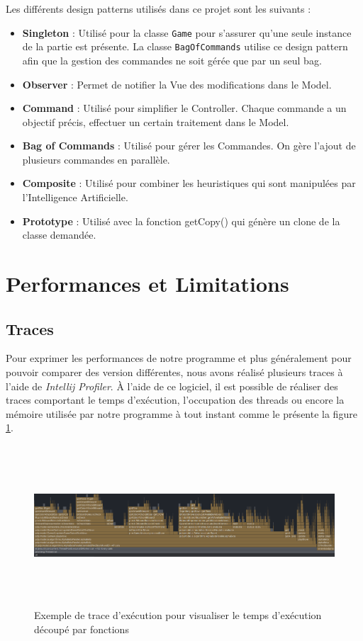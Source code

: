 \documentclass{article}
\begin{document}
Les différents design patterns utilisés dans ce projet sont les suivants :
\begin{itemize}
    \item \textbf{Singleton} : Utilisé pour la classe \texttt{Game} pour s'assurer qu'une seule instance de la partie est présente.
    La classe \texttt{BagOfCommands} utilise ce design pattern afin que la gestion des commandes ne soit gérée que par un seul bag.
    \item \textbf{Observer} : Permet de notifier la Vue des modifications dans le Model.
    \item \textbf{Command} : Utilisé pour simplifier le Controller. Chaque commande a un objectif précis, effectuer un certain traitement dans le Model.
    \item \textbf{Bag of Commands} : Utilisé pour gérer les Commandes. On gère l'ajout de plusieurs commandes en parallèle.
    \item \textbf{Composite} : Utilisé pour combiner les heuristiques qui sont manipulées par l'Intelligence Artificielle.
    \item \textbf{Prototype} : Utilisé avec la fonction getCopy() qui génère un clone de la classe demandée.
\end{itemize}


\section{Performances et Limitations}
\subsection{Traces}
Pour exprimer les performances de notre programme et plus généralement pour pouvoir comparer des version différentes, nous avons réalisé plusieurs
traces à l'aide de \textit{Intellij Profiler}. À l'aide de ce logiciel, il est possible de réaliser des traces comportant le temps d'exécution, l'occupation des threads
ou encore la mémoire utilisée par notre programme à tout instant comme le présente la figure \ref{trace_ex}.

\begin{figure}[h]
    \centering
    \includegraphics[width=\textwidth,height=6.0cm,keepaspectratio]{trace_example.png}
    \caption{Exemple de trace d'exécution pour visualiser le temps d'exécution découpé par fonctions}
    \label{trace_ex}
\end{figure}
\end{document}
